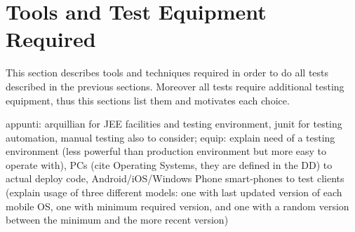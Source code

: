 \newpage
\section{Tools and Test Equipment Required}
This section describes tools and techniques required in order to do all tests described in the previous sections. Moreover all tests require additional testing equipment, thus this sections list them and motivates each choice.

appunti: arquillian for JEE facilities and testing environment, junit for testing automation, manual testing also to consider; equip: explain need of a testing environment (less powerful than production environment but more easy to operate with), PCs (cite Operating Systems, they are defined in the DD) to actual deploy code, Android/iOS/Windows Phone smart-phones to test clients (explain usage of three different models: one with last updated version of each mobile OS, one with minimum required version, and one with a random version between the minimum and the more recent version)